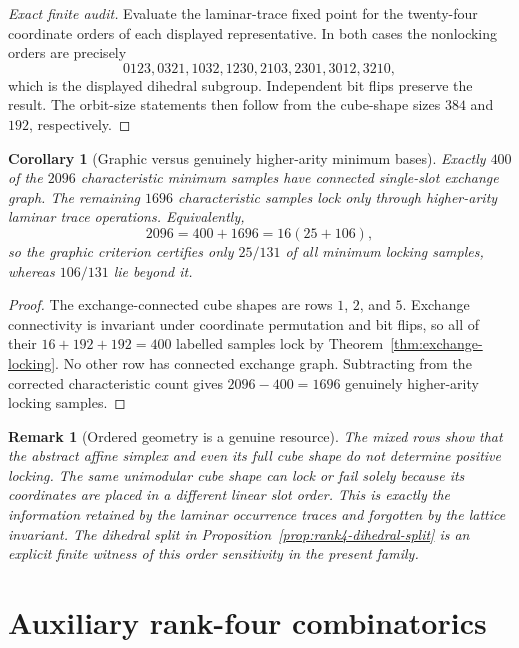 \documentclass[11pt]{article}
\newtheorem{corollary}[definition]{Corollary}
\newtheorem{remark}[definition]{Remark}
\begin{document}
\begin{proof}[Exact finite audit]
Evaluate the laminar-trace fixed point for the twenty-four coordinate orders of
each displayed representative.  In both cases the nonlocking orders are
precisely
\[
 0123,0321,1032,1230,2103,2301,3012,3210,
\]
which is the displayed dihedral subgroup.  Independent bit flips preserve the
result.  The orbit-size statements then follow from the cube-shape sizes
$384$ and $192$, respectively.
\end{proof}

\begin{corollary}[Graphic versus genuinely higher-arity minimum bases]
\label{cor:graphic-vs-higher-rank-count}
Exactly $400$ of the $2096$ characteristic minimum samples have connected
single-slot exchange graph.  The remaining $1696$ characteristic samples lock
only through higher-arity laminar trace operations.  Equivalently,
\[
  \boxed{
  2096=400+1696=16(25+106),
  }
\]
so the graphic criterion certifies only $25/131$ of all minimum locking
samples, whereas $106/131$ lie beyond it.
\end{corollary}

\begin{proof}
The exchange-connected cube shapes are rows $1$, $2$, and $5$.  Exchange
connectivity is invariant under coordinate permutation and bit flips, so all
of their $16+192+192=400$ labelled samples lock by
Theorem~\ref{thm:exchange-locking}.  No other row has connected exchange graph.
Subtracting from the corrected characteristic count gives
$2096-400=1696$ genuinely higher-arity locking samples.
\end{proof}

\begin{remark}[Ordered geometry is a genuine resource]
The mixed rows show that the abstract affine simplex and even its full cube
shape do not determine positive locking.  The same unimodular cube shape can
lock or fail solely because its coordinates are placed in a different linear
slot order.  This is exactly the information retained by the laminar occurrence
traces and forgotten by the lattice invariant.  The dihedral split in
Proposition~\ref{prop:rank4-dihedral-split} is an explicit finite witness of this
order sensitivity in the present family.
\end{remark}


\section{Auxiliary rank-four combinatorics}
\label{app:rank4-aux}
\end{document}

